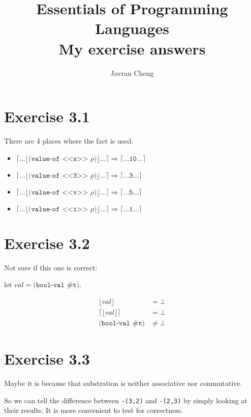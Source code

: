 \documentclass[11pt,a4paper]{article}
\title{Essentials of Programming Languages\\
{\large
My exercise answers}}
\author{Javran Cheng}
\begin{document}
\maketitle

\section{Exercise 3.1}

There are 4 places where the fact is used:

\begin{itemize}
    \item$  \lceil \dots \lfloor
                \texttt{(value-of <<x>> $\rho$)}
            \rfloor \dots \rceil
         \Rightarrow
            \lceil \dots
                \texttt{10}
            \dots \rceil$
    \item$  \lceil \dots \lfloor
                \texttt{(value-of <<3>> $\rho$)}
            \rfloor \dots \rceil
         \Rightarrow
            \lceil \dots
                \texttt{3}
            \dots \rceil$
    \item$  \lceil \dots \lfloor
                \texttt{(value-of <<v>> $\rho$)}
            \rfloor \dots \rceil
         \Rightarrow
            \lceil \dots
                \texttt{5}
            \dots \rceil$
    \item$  \lceil \dots \lfloor
                \texttt{(value-of <<i>> $\rho$)}
            \rfloor \dots \rceil
         \Rightarrow
            \lceil \dots
                \texttt{1}
            \dots \rceil$

\end{itemize}

\section{Exercise 3.2}

Not sure if this one is correct:

let $val = \texttt{(bool-val \#t)}$.

\begin{align*}
    \lfloor val \rfloor & = \bot \\
    \lceil \lfloor val \rfloor \rceil  & = \bot \\
    \texttt{(bool-val \#t)} & \neq \bot
\end{align*}
    
\section{Exercise 3.3}

Maybe it is because that substration is neither associative nor commutative.

So we can tell the difference between \texttt{-(3,2)} and \texttt{-(2,3)} by simply
looking at their results. It is more convenient to test for correctness.
\end{document}
